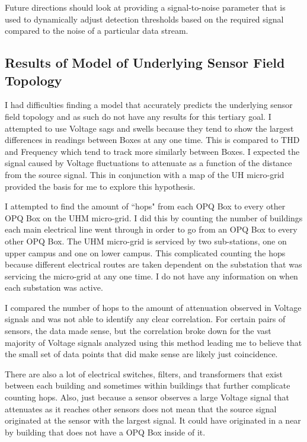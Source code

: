 Future directions should look at providing a signal-to-noise parameter that is used to dynamically adjust detection thresholds based on the required signal compared to the noise of a particular data stream.

\subsection{Results of Model of Underlying Sensor Field Topology}\label{subsec:results-of-model-of-underlying-sensor-field-topology}

I had difficulties finding a model that accurately predicts the underlying sensor field topology and as such do not have any results for this tertiary goal. I attempted to use Voltage sags and swells because they tend to show the largest differences in readings between Boxes at any one time. This is compared to THD and Frequency which tend to track more similarly between Boxes. I expected the signal caused by Voltage fluctuations to attenuate as a function of the distance from the source signal. This in conjunction with a map of the UH micro-grid provided the basis for me to explore this hypothesis.

I attempted to find the amount of ``hops" from each OPQ Box to every other OPQ Box on the UHM micro-grid. I did this by counting the number of buildings each main electrical line went through in order to go from an OPQ Box to every other OPQ Box. The UHM micro-grid is serviced by two sub-stations, one on upper campus and one on lower campus. This complicated counting the hops because different electrical routes are taken dependent on the substation that was servicing the micro-grid at any one time. I do not have any information on when each substation was active.

I compared the number of hops to the amount of attenuation observed in Voltage signals and was not able to identify any clear correlation. For certain pairs of sensors, the data made sense, but the correlation broke down for the vast majority of Voltage signals analyzed using this method leading me to believe that the small set of data points that did make sense are likely just coincidence.

There are also a lot of electrical switches, filters, and transformers that exist between each building and sometimes within buildings that further complicate counting hops. Also, just because a sensor observes a large Voltage signal that attenuates as it reaches other sensors does not mean that the source signal originated at the sensor with the largest signal. It could have originated in a near by building that does not have a OPQ Box inside of it.


